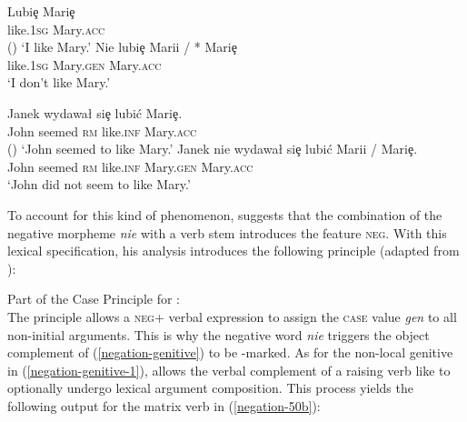 \documentclass[output=paper,biblatex,babelshorthands,newtxmath,draftmode,colorlinks,citecolor=brown]{langscibook}
\begin{document}
\begin{exe}
\begin{xlist}
\begin{exe}
\begin{xlist}
\eal
\ex  \label{negation-genitive}
\gll Lubi\c{e} Mari\c{e} \\
     like.1\textsc{sg} Mary.\textsc{acc}\\\hfill()
\glt `I like Mary.'
\ex \label{negation-49b}
\gll Nie lubi\c{e} Marii / * Mari\c{e} \\
     \NEG{} like.1\textsc{sg} Mary.\textsc{gen} {} {} Mary.\textsc{acc}\\
\glt `I don't like Mary.'
\zl

\eal
\ex \label{negation-genitive-1}
\gll  Janek wydawa\l{} si\c{e} lubi\'{c} Mari\c{e}.\\
      John seemed \textsc{rm}     like.\textsc{inf} Mary.\textsc{acc}\\\hfill()
\glt `John seemed to like Mary.'
\ex \label{negation-50b}
\gll  Janek nie wydawa\l{} si\c{e} lubi\'{c} Marii / Mari\c{e}.\\
      John \NEG{} seemed \textsc{rm} like.\textsc{inf}      Mary.\textsc{gen} {} Mary.\textsc{acc}\\
\glt `John did not seem to like Mary.'
\zl

\noindent
To account for this kind of phenomenon, \citet{Prz:00}
suggests that the combination of the
negative morpheme \emph{nie} with a verb stem introduces the
feature \textsc{neg}.
With this lexical specification, his analysis introduces
 the following principle (adapted from \citealt[]{Prz:00}):

\ea
\label{negation-polish-gen-case}
Part of the Case Principle for :\\
  \impl
{}
\z
The principle allows a \textsc{neg}+ verbal expression to assign
 the \textsc{case} value \textit{gen} to all
non-initial arguments.
%
This is why the negative word \emph{nie} triggers the object complement of
(\ref{negation-genitive}) to be \GEN-marked.
As for the non-local genitive in (\ref{negation-genitive-1}), \citet[]{Prz:00}
allows the verbal complement of a raising verb like  to optionally undergo lexical
argument composition. This process yields the following output for the
matrix verb in (\ref{negation-50b}):


\end{xlist}
\end{exe}
\end{xlist}
\end{exe}
\end{document}
